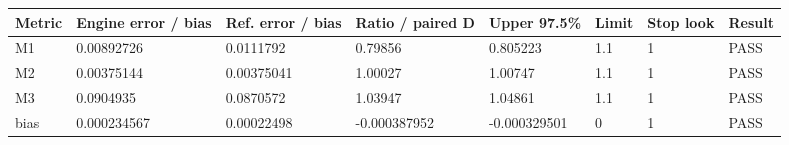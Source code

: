 \begin{tabular}{llllllll}
\toprule
Metric & Engine error / bias & Ref. error / bias & Ratio / paired D & Upper 97.5\% & Limit & Stop look & Result \\
\midrule
M1 & 0.00892726 & 0.0111792 & 0.79856 & 0.805223 & 1.1 & 1 & PASS \\
M2 & 0.00375144 & 0.00375041 & 1.00027 & 1.00747 & 1.1 & 1 & PASS \\
M3 & 0.0904935 & 0.0870572 & 1.03947 & 1.04861 & 1.1 & 1 & PASS \\
bias & 0.000234567 & 0.00022498 & -0.000387952 & -0.000329501 & 0 & 1 & PASS \\
\bottomrule
\end{tabular}

